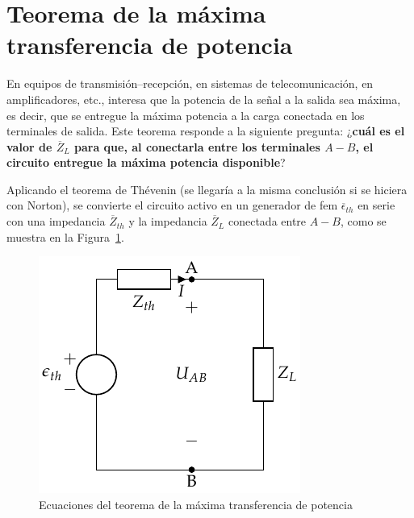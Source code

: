     
    
    
    

\section{Teorema de la máxima transferencia de potencia}
\label{sec:teorema-max_potencia}

En equipos de transmisión--recepción, en sistemas de telecomunicación,
en amplificadores, etc., interesa que la potencia de la señal a la
salida sea máxima, es decir, que se entregue la máxima potencia a la
carga conectada en los terminales de salida.  Este teorema responde a
la siguiente pregunta: ¿\textbf{cuál es el valor de $\overline{Z}_L$ para que,
  al conectarla entre los terminales $A-B$, el circuito entregue la
  máxima potencia disponible}?

Aplicando el teorema de Thévenin (se llegaría a la misma conclusión si
se hiciera con Norton), se convierte el circuito activo en un
generador de fem $\overline{\epsilon}_{th}$ en serie con una
impedancia $\overline{Z}_{th}$ y la impedancia $\overline{Z}_L$
conectada entre $A-B$, como se muestra en la
Figura~\ref{fig:equivalenteThevenin0_ca}.
\begin{figure}[H]
  \centering \includegraphics{../figs/EquivalenteThevenin.pdf}
  \caption{Ecuaciones del teorema de la máxima transferencia de
    potencia}
  \label{fig:equivalenteThevenin0_ca}
\end{figure}

